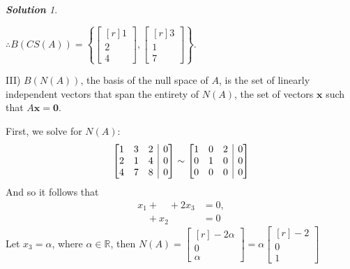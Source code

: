 \documentclass[12pt, letterpaper]{article}
\makeatletter
\theoremstyle{remark}
\theoremstyle{remark}
\newtheorem*{solution}{\textbf{Solution}}
\newenvironment{amatrix}[1]{%
    \left[\begin{array}{@{}*{#1}{c}|c@{}}
    }{%
        \end{array}\right]
    }
\makeatother
\begin{document}
\begin{solution}
\begin{enumerate}[(a)]
		      \(\therefore B(CS(A)) = \left \{\begin{bmatrix*}[r]
			      1 \\
			      2 \\
			      4
		      \end{bmatrix*}, \begin{bmatrix*}[r]
			      3 \\
			      1 \\
			      7
		      \end{bmatrix*} \right \}.\)

		      \bigskip

		      III) \(B(N(A))\), the basis of the null space of $A$, is
		      the set of linearly independent vectors that span the entirety of
		      \(N(A)\), the set of vectors \(\bm{x}\) such that \(A\bm{x}=\bm{0}\).

		      First, we solve for \(N(A)\):
		      \[
			      \begin{amatrix}{3}
				      1 & 3 & 2 & 0 \\
				      2 & 1 & 4 & 0 \\
				      4 & 7 & 8 & 0
			      \end{amatrix} \sim
			      \begin{amatrix}{3}
				      1 & 0 & 2 & 0 \\
				      0 & 1 & 0 & 0 \\
				      0 & 0 & 0 & 0
			      \end{amatrix}
              \]
              And so it follows that \begin{align*}
                  x_1 + \phantom{x_2} + 2x_3 &= 0, \\
                  \phantom{x_1} + x_2 &= 0
              \end{align*}
              Let \(x_3 = \alpha\), where \(\alpha \in \mathbb{R}\), 
              then \(N(A) = \begin{bmatrix*}[r]
                  -2\alpha \\
                  0 \\
                  \alpha
              \end{bmatrix*} = \alpha\begin{bmatrix*}[r]
                  -2 \\
                  0 \\
                  1
              \end{bmatrix*}\)
              
              \bigskip
              

\end{enumerate}
\end{solution}
\end{document}
